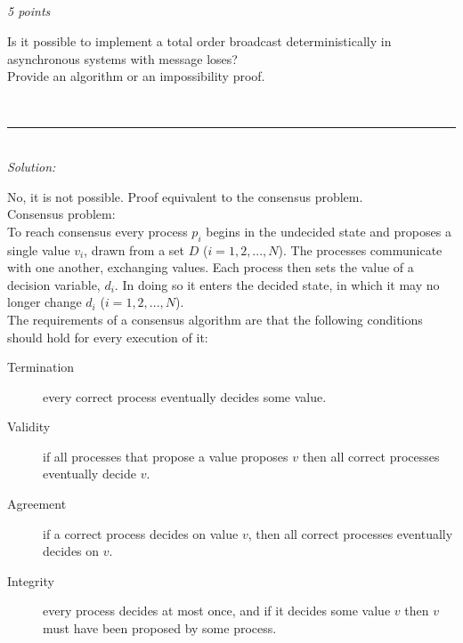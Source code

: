 \documentclass[a4paper]{article}
\newcommand{\horrule}[1]{\rule{\linewidth}{#1}} %
\newcommand{\points}[1]{\subsection{} \textit{#1 points}\\}
\newcommand{\question}[2][]{
  \noindent
  \parbox[t]{\textwidth}{#1 \parbox[t]{0.95\textwidth}{#2}}\\
}
\newcommand{\solution}[1]{\horrule{0.5pt}\\[3pt]\textit{Solution: }\\\begin{minipage}{\textwidth}#1\end{minipage}}
\begin{document}
{  
}


\points{5}
\question{
  Is it possible to implement a total order broadcast
  deterministically in asynchronous systems with message loses? \\
  Provide an algorithm or an impossibility proof.
}
\solution{
  No, it is not possible. Proof equivalent to the consensus problem.\\
  Consensus problem:\\
  To reach consensus every process $p_i$ begins in the undecided
  state and proposes a single value $v_i$, drawn from a set $D$ ($i =
  1, 2, ..., N$). The processes communicate with one another,
  exchanging values. Each process then sets the value of a decision
  variable, $d_i$. In doing so it enters the decided state, in which
  it may no longer change $d_i$ ($i = 1, 2, ..., N$). \\

  The requirements of a consensus algorithm are that the following
  conditions should hold for every execution of it:
  \begin{description}
    \item[Termination] every correct process eventually decides some
      value.
    \item[Validity] if all processes that propose a value proposes $v$
      then all correct processes eventually decide $v$.
    \item[Agreement] if a correct process decides on value $v$, then all correct
      processes eventually decides on $v$.
    \item[Integrity] every process decides at most once, and if it
      decides some value $v$ then $v$ must have been proposed by some process.
  \end{description}

}
\end{document}
